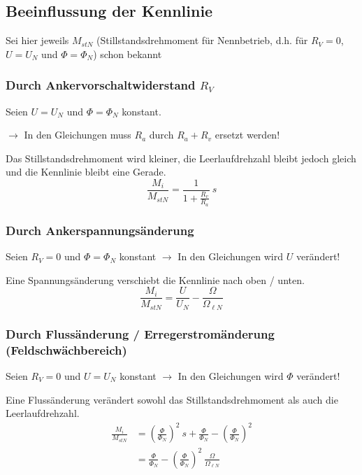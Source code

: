 \documentclass[11pt]{article}
\begin{document}
\subsection*{Beeinflussung der Kennlinie}
Sei hier jeweils $M_{stN}$ (Stillstandsdrehmoment für Nennbetrieb, d.h. für $R_V = 0$, $U = U_N$ und $\Phi = \Phi_N$) schon bekannt

\subsubsection*{Durch Ankervorschaltwiderstand $R_V$}
Seien $U = U_N$ und $\Phi = \Phi_N$ konstant.

\vspace{.5em}
\raggedright
$\rightarrow$ In den Gleichungen muss $R_a$ durch $R_a + R_v$ ersetzt werden!

\vspace{.5em}
\raggedright
Das Stillstandsdrehmoment wird kleiner, die Leerlaufdrehzahl bleibt jedoch gleich und die Kennlinie bleibt eine Gerade.
\[
	\frac{M_i}{M_{stN}} = \frac{1}{1 + \frac{R_v}{R_a}} ~ s
\]

\subsubsection*{Durch Ankerspannungsänderung}
Seien $R_V = 0$ und $\Phi = \Phi_N$ konstant $\rightarrow$ In den Gleichungen wird $U$ verändert!

\vspace{.5em}
\raggedright
Eine Spannungsänderung verschiebt die Kennlinie nach oben / unten.
\[
	\frac{M_i}{M_{stN}} = \frac{U}{U_N} - \frac{\Omega}{\Omega_{\ell N}}
\]

\subsubsection*{Durch Flussänderung / Erregerstromänderung (Feldschwächbereich)}
Seien $R_V = 0$ und $U = U_N$ konstant $\rightarrow$ In den Gleichungen wird $\Phi$ verändert!

\vspace{.5em}
\raggedright
Eine Flussänderung verändert sowohl das Stillstandsdrehmoment als auch die Leerlaufdrehzahl.
\begin{align*}
	\frac{M_i}{M_{stN}} &= \left(\frac{\Phi}{\Phi_N}\right)^2 ~ s + \frac{\Phi}{\Phi_N} - \left(\frac{\Phi}{\Phi_N} \right)^2 \\
		&= \frac{\Phi}{\Phi_N} - \left(\frac{\Phi}{\Phi_N}\right)^2 ~ \frac{\Omega}{\Omega_{\ell N}}
\end{align*}
\end{document}
